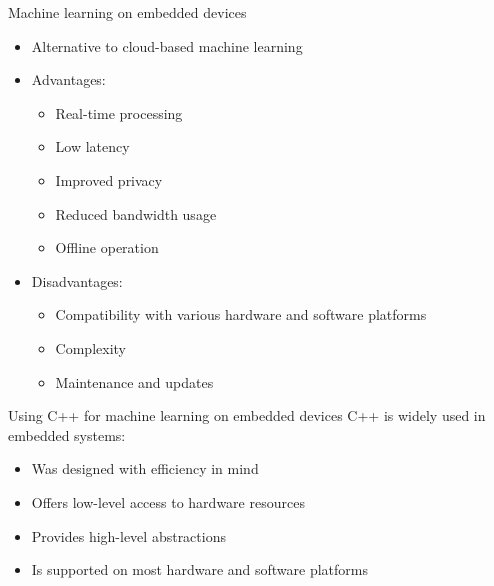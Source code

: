 \begin{frame}{Machine learning on embedded devices}
\begin{itemize}
 \item Alternative to cloud-based machine learning
 \item Advantages:
	\begin{itemize}
	  \item Real-time processing
	  \item Low latency
	  \item Improved privacy
	  \item Reduced bandwidth usage
	  \item Offline operation
	\end{itemize}
  \item Disadvantages:
	\begin{itemize}
	  \item Compatibility with various hardware and software platforms
	  \item Complexity
	  \item Maintenance and updates
	\end{itemize}
\end{itemize}
\end{frame}

\begin{frame}{Using C++ for machine learning on embedded devices}
C++ is widely used in embedded systems:
\begin{itemize}
 \item Was designed with efficiency in mind
 \item Offers low-level access to hardware resources
 \item Provides high-level abstractions
 \item Is supported on most hardware and software platforms
\end{itemize}
\end{frame}

